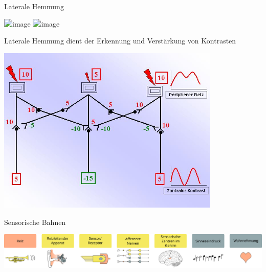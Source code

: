 \documentclass{beamer}
\begin{document}
\begin{frame}{Laterale Hemmung}

\begin{center}

    \includegraphics<1>[width=\textwidth]{lateral_inhibition_funkction_1.png}
        \includegraphics<2>[width=\textwidth]{lateral_inhibition_funkction_2.png}
\end{center}

\end{frame}


\begin{frame}{Laterale Hemmung dient der Erkennung und Verstärkung von Kontrasten }

\begin{center}
    \includegraphics[width=0.8\textwidth]{Laterale_Inhibition.jpg}
\end{center}


\end{frame}

\begin{frame}{Sensorische Bahnen}
\begin{center}
    \includegraphics[width=\textwidth]{wahrnehmungsprozess.png}
\end{center}
    
\end{frame}



\end{document}
